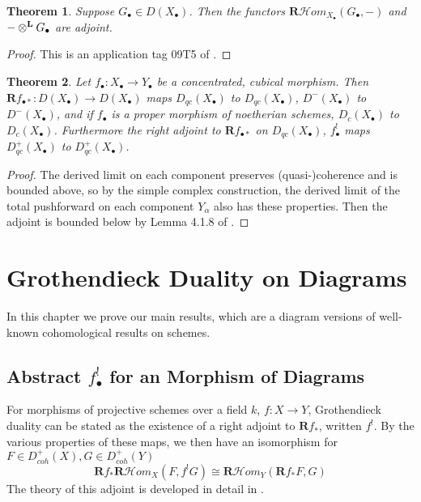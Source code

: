 \documentclass[proquest]{uwthesis}[2014/11/13]
\newtheorem{theorem}{Theorem}[section]
\theoremstyle{definition}
\newcommand{\cHom}{\mathcal{H} \textit{om}}
\newcommand{\bR}{\textbf{R}}
\newcommand{\otimesL}{\otimes^{\bf L}}
\begin{document}
\begin{theorem}
	Suppose $G_\bullet \in D(X_\bullet)$.
	Then the functors $\bR \cHom_{X_\bullet}(G_\bullet, -)$ and $-\otimesL G_\bullet$ are adjoint.
\end{theorem}
\begin{proof}
	This is an application tag 09T5 of \cite{stacks}.
\end{proof}

\begin{theorem}
	\label{thm:pushforwardbounds}
	Let $f_\bullet : X_\bullet \rightarrow Y_\bullet$ be a concentrated, cubical morphism.
	Then $\bR f_{\bullet *} : D(X_\bullet) \rightarrow D(X_\bullet)$ maps $D_{qc}(X_\bullet)$ to $D_{qc}(X_\bullet)$, $D^-(X_\bullet)$ to $D^-(X_\bullet)$, and if $f_\bullet$ is a proper morphism of noetherian schemes, $D_c(X_\bullet)$ to $D_c(X_\bullet)$.
	Furthermore the right adjoint to $\bR f_{\bullet *}$ on $D_{qc}(X_\bullet)$, $f_\bullet^!$ maps $D_{qc}^+(X_\bullet)$ to $D_{qc}^+(X_\bullet)$.
\end{theorem}
\begin{proof}
	The derived limit on each component preserves (quasi-)coherence and is bounded above, so by the simple complex construction, the derived limit of the total pushforward on each component $Y_\alpha$ also has these properties.
	Then the adjoint is bounded below by Lemma 4.1.8 of \cite{Lipman2009}.
\end{proof}

\chapter{Grothendieck Duality on Diagrams}
\label{chp:grothendieckduality}

In this chapter we prove our main results, which are a diagram versions of well-known cohomological results on schemes.

\section{Abstract $f_\bullet^!$ for an Morphism of Diagrams}
For morphisms of projective schemes over a field $k$, $f : X \rightarrow Y$, Grothendieck duality can be stated as the existence of a right adjoint to $\bR f_*$, written $f^!$.
By the various properties of these maps, we then have an isomorphism for $F \in D_{coh}^+(X), G \in D_{coh}^+(Y)$
\[
\bR f_* \bR \cHom_X(F, f^! G) \cong \bR \cHom_Y(\bR f_* F, G)
\]
The theory of this adjoint is developed in detail in \cite{Hartshorne1966}.
\end{document}
